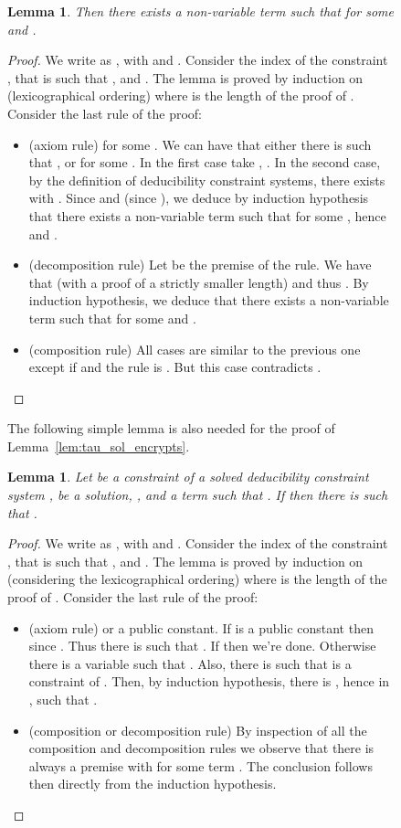\documentclass[acmtocl,acmnow]{acmtrans2m}
\newtheorem{lemma}[theorem]{Lemma}
\newcommand{\dedsys}[1]{deducibility constraint system}
\newcommand{\dedsyss}[1]{deducibility constraint systems}
\begin{document}
\begin{figure}[t]
{{\begin{lemma}
Then there exists a non-variable term  such that   for some 
and .
\end{lemma}
\begin{proof}
We write  as , with  and .
Consider the index  of the constraint , that is such that ,  and
. The lemma is proved by induction on  (lexicographical ordering)
where  is the length of the proof of .
Consider the last rule of the proof:
\begin{itemize}
\item (axiom rule)  for some . We can have that either there is  such
that , or  for some . In the first case
take , . In the second case, by the definition of \dedsyss{},
there exists  with . Since  and  (since ), we
deduce by induction hypothesis that there exists a non-variable term
 such that  for some , hence  and .
\item (decomposition rule) Let  be the premise of the rule. We have that  (with a
  proof of a strictly smaller length) and 
thus . By induction hypothesis, we deduce that there
exists a non-variable term  such that   for some  and .
\item (composition rule) All cases are similar to the previous one
  except if  and the rule is {\small
}.
But this case contradicts .
\end{itemize}
\end{proof}





The following simple lemma is also needed for the proof of Lemma~\ref{lem:tau_sol_encrypts}.
\begin{lemma}\label{lem:rho}
Let  be a constraint of a solved \dedsys{} ,  be a
solution, , and  a term such that .
If  then there is  such that .
\end{lemma}
\begin{proof}
We write  as , with  and .
Consider the index  of the constraint , that is such that ,  and . The lemma is proved by induction on  (considering the lexicographical ordering)
where  is the length of the proof of . Consider the last rule of the proof:
\begin{itemize}
 \item (axiom rule)  or  a public constant. If  is a public constant then  since . Thus there is  such that . If  then we're done. Otherwise there is a variable  such that . Also, there is  such that  is a constraint of . Then, by induction hypothesis, there is , hence in , such that .

 \item (composition or decomposition rule) By inspection of all the composition and decomposition rules we observe that there is always a premise  with  for some term . The conclusion follows then directly from the induction hypothesis.
\end{itemize}
\end{proof}


}}
\end{figure}
\end{document}
